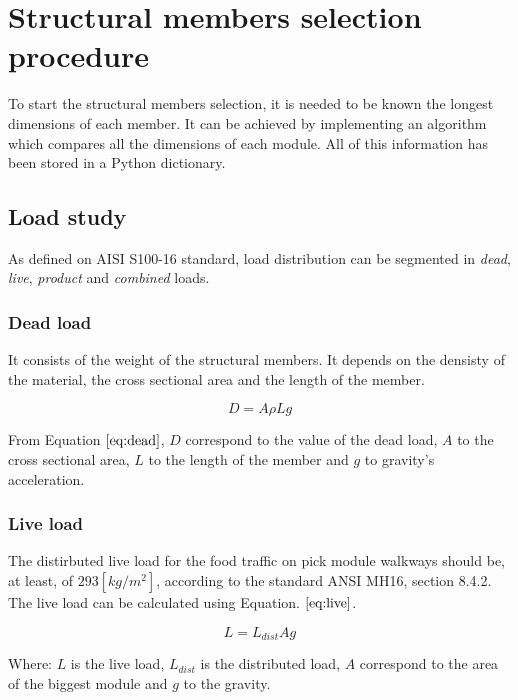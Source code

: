 \section{Structural members selection procedure}

To start the structural members selection, it is needed to be known the longest dimensions of each member. It can be achieved by implementing an algorithm which compares all the dimensions of each module. All of this information has been stored in a Python dictionary.

\subsection{Load study}

As defined on AISI S100-16 standard, load distribution can be segmented in \textit{dead}, \textit{live}, \textit{product} and \textit{combined} loads. 

\subsubsection{Dead load}

It consists of the weight of the structural members. It depends on the densisty of the material, the cross sectional area and the length of the member.

\begin{equation}
    D = A \rho L g
    \label{eq:dead}
\end{equation}

From Equation $\eqref{eq:dead}$, $D$ correspond to the value of the dead load, $A$ to the cross sectional area, $L$ to the length of the member and $g$ to gravity's acceleration.

\subsubsection{Live load}

The distirbuted live load for the food traffic on pick module walkways should be, at least, of $293 \left[kg / m^2 \right]$, according to the standard ANSI MH16, section 8.4.2. The live load can be calculated using Equation. $\eqref{eq:live}$.

\begin{equation}
    L = L_{dist} A g
    \label{eq:live}
\end{equation}

 Where: $L$ is the live load, $L_{dist}$ is the distributed load, $A$ correspond to the area of the biggest module and $g$ to the gravity.

